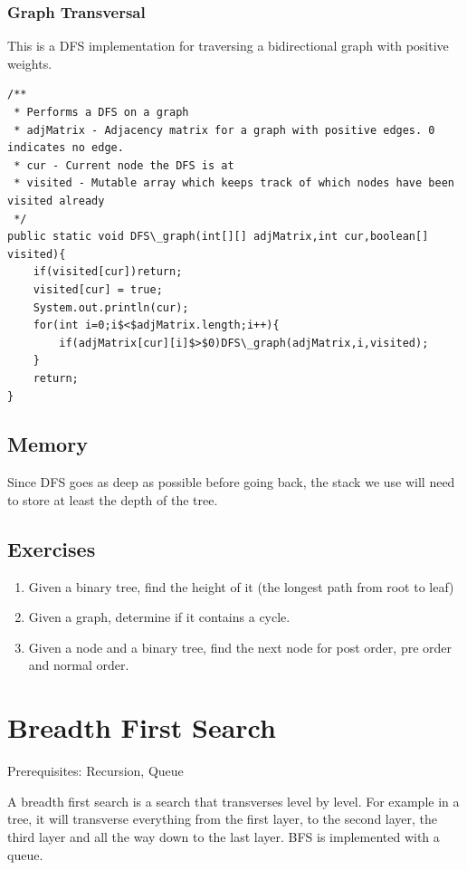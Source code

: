\documentclass[11pt,oneside]{book}
\begin{document}
\subsubsection{Graph Transversal}

This is a DFS implementation for traversing a bidirectional graph with positive weights.

\begin{lstlisting}
/**
 * Performs a DFS on a graph
 * adjMatrix - Adjacency matrix for a graph with positive edges. 0 indicates no edge.
 * cur - Current node the DFS is at
 * visited - Mutable array which keeps track of which nodes have been visited already
 */
public static void DFS\_graph(int[][] adjMatrix,int cur,boolean[] visited){
    if(visited[cur])return;
    visited[cur] = true;
    System.out.println(cur);
    for(int i=0;i$<$adjMatrix.length;i++){
        if(adjMatrix[cur][i]$>$0)DFS\_graph(adjMatrix,i,visited);
    }
    return;
}

\end{lstlisting}

\subsection{Memory}

Since DFS goes as deep as possible before going back, the stack we use will need to store at least the depth of the tree.

\subsection{Exercises}

\begin{enumerate}
\item Given a binary tree, find the height of it (the longest path from root to leaf)
\item Given a graph, determine if it contains a cycle.
\item Given a node and a binary tree, find the next node for post order, pre order and normal order.
\end{enumerate}

        \section{ Breadth First Search }
        

Prerequisites: Recursion, Queue

A breadth first search is a search that transverses level by level. For example in a tree, it will transverse everything from the first layer, to the second layer, the third layer and all the way down to the last layer. BFS is implemented with a queue.
\end{document}
